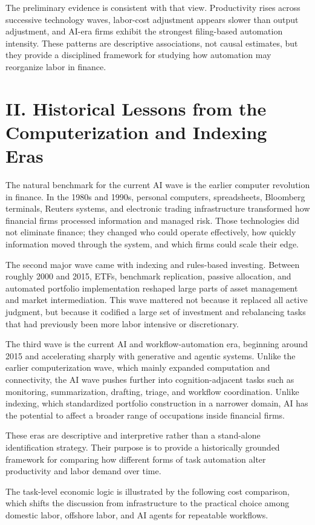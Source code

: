 \documentclass[11pt]{article}
\begin{document}
The preliminary evidence is consistent with that view. Productivity rises across successive technology waves, labor-cost adjustment appears slower than output adjustment, and AI-era firms exhibit the strongest filing-based automation intensity. These patterns are descriptive associations, not causal estimates, but they provide a disciplined framework for studying how automation may reorganize labor in finance.

\section{II. Historical Lessons from the Computerization and Indexing Eras}
The natural benchmark for the current AI wave is the earlier computer revolution in finance. In the 1980s and 1990s, personal computers, spreadsheets, Bloomberg terminals, Reuters systems, and electronic trading infrastructure transformed how financial firms processed information and managed risk. Those technologies did not eliminate finance; they changed who could operate effectively, how quickly information moved through the system, and which firms could scale their edge.

The second major wave came with indexing and rules-based investing. Between roughly 2000 and 2015, ETFs, benchmark replication, passive allocation, and automated portfolio implementation reshaped large parts of asset management and market intermediation. This wave mattered not because it replaced all active judgment, but because it codified a large set of investment and rebalancing tasks that had previously been more labor intensive or discretionary.

The third wave is the current AI and workflow-automation era, beginning around 2015 and accelerating sharply with generative and agentic systems. Unlike the earlier computerization wave, which mainly expanded computation and connectivity, the AI wave pushes further into cognition-adjacent tasks such as monitoring, summarization, drafting, triage, and workflow coordination. Unlike indexing, which standardized portfolio construction in a narrower domain, AI has the potential to affect a broader range of occupations inside financial firms.

These eras are descriptive and interpretive rather than a stand-alone identification strategy. Their purpose is to provide a historically grounded framework for comparing how different forms of task automation alter productivity and labor demand over time.

The task-level economic logic is illustrated by the following cost comparison, which shifts the discussion from infrastructure to the practical choice among domestic labor, offshore labor, and AI agents for repeatable workflows.
\end{document}
